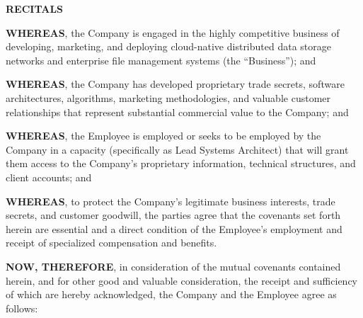 \documentclass[11pt,a4paper]{article}
\begin{document}
\vspace{2ex}
\begin{recitalbox}
    \noindent\textbf{\color{legalnavy}RECITALS}
    \vspace{1ex}
    
    \noindent
    \textbf{WHEREAS}, the Company is engaged in the highly competitive business of developing, marketing, and deploying cloud-native distributed data storage networks and enterprise file management systems (the ``Business''); and
    
    \noindent
    \textbf{WHEREAS}, the Company has developed proprietary trade secrets, software architectures, algorithms, marketing methodologies, and valuable customer relationships that represent substantial commercial value to the Company; and
    
    \noindent
    \textbf{WHEREAS}, the Employee is employed or seeks to be employed by the Company in a capacity (specifically as Lead Systems Architect) that will grant them access to the Company's proprietary information, technical structures, and client accounts; and
    
    \noindent
    \textbf{WHEREAS}, to protect the Company's legitimate business interests, trade secrets, and customer goodwill, the parties agree that the covenants set forth herein are essential and a direct condition of the Employee's employment and receipt of specialized compensation and benefits.
\end{recitalbox}

\vspace{2ex}
\noindent
\textbf{NOW, THEREFORE}, in consideration of the mutual covenants contained herein, and for other good and valuable consideration, the receipt and sufficiency of which are hereby acknowledged, the Company and the Employee agree as follows:

\vspace{2ex}
\end{document}
